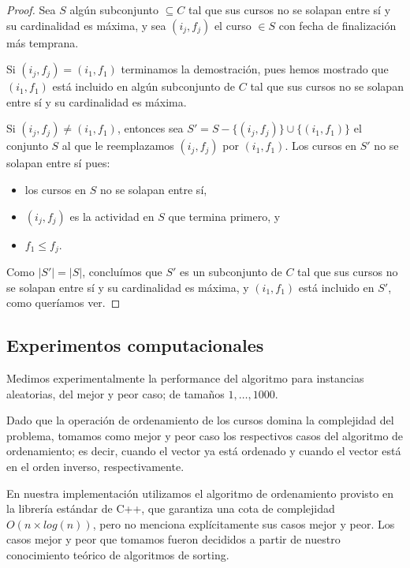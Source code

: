 \documentclass[a4paper, 10pt, twoside]{article}
\begin{document}
\begin{proof}
    Sea $S$ algún subconjunto $\subseteq C$ tal que sus cursos no se solapan entre sí y su cardinalidad es máxima, y sea $(i_j, f_j)$ el curso $\in S$ con fecha de finalización más temprana.

    Si $(i_j, f_j) = (i_1, f_1)$ terminamos la demostración, pues hemos mostrado que $(i_1, f_1)$ está incluido en algún subconjunto de $C$ tal que sus cursos no se solapan entre sí y su cardinalidad es máxima.

    Si $(i_j, f_j) \neq (i_1, f_1)$, entonces sea $S' = S - \{ (i_j, f_j) \} \cup \{ (i_1, f_1) \}$ el conjunto $S$ al que le reemplazamos $(i_j, f_j)$ por $(i_1, f_1)$. Los cursos en $S'$ no se solapan entre sí pues:

    \begin{itemize}[nolistsep]
        \item{los cursos en $S$ no se solapan entre sí,}
        \item{$(i_j, f_j)$ es la actividad en $S$ que termina primero, y}
        \item{$f_1 \leq f_j$.}
    \end{itemize}

    Como $|S'| = |S|$, concluímos que $S'$ es un subconjunto de $C$ tal que sus cursos no se solapan entre sí y su cardinalidad es máxima, y $(i_1, f_1)$ está incluido en $S'$, como queríamos ver.
\end{proof}


\subsection{Experimentos computacionales}

Medimos experimentalmente la performance del algoritmo para instancias aleatorias, del mejor y peor caso; de tamaños $1, \ldots, 1000$.

Dado que la operación de ordenamiento de los cursos domina la complejidad del problema, tomamos como mejor y peor caso los respectivos casos del algoritmo de ordenamiento; es decir, cuando el vector ya está ordenado y cuando el vector está en el orden inverso, respectivamente.

En nuestra implementación utilizamos el algoritmo de ordenamiento provisto en la librería estándar de C++, que garantiza una cota de complejidad $O(n \times log(n))$, pero no menciona explícitamente sus casos mejor y peor. Los casos mejor y peor que tomamos fueron decididos a partir de nuestro conocimiento teórico de algoritmos de sorting.
\end{document}
